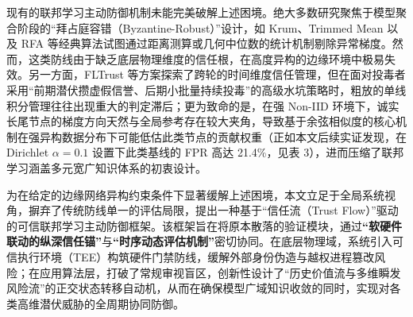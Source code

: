 \documentclass[runningheads]{llncs}
\begin{document}
现有的联邦学习主动防御机制未能完美破解上述困境。绝大多数研究聚焦于模型聚合阶段的“拜占庭容错（Byzantine-Robust）”设计，如 Krum、Trimmed Mean 以及 RFA 等经典算法试图通过距离测算或几何中位数的统计机制剔除异常梯度\cite{blanchard2017krum,yin2018byzantine,pillutla2022robust}。然而，这类防线由于缺乏底层物理维度的信任根，在高度异构的边缘环境中极易失效。另一方面，FLTrust 等方案探索了跨轮的时间维度信任管理\cite{cao2021fltrust,fung2020foolsgold}，但在面对投毒者采用“前期潜伏攒虚假信誉、后期小批量持续投毒”的高级水坑策略时，粗放的单线积分管理往往出现重大的判定滞后；更为致命的是，在强 Non-IID 环境下，诚实长尾节点的梯度方向天然与全局参考存在较大夹角，导致基于余弦相似度的核心机制在强异构数据分布下可能低估此类节点的贡献权重（正如本文后续实证发现，在 Dirichlet $\alpha=0.1$ 设置下此类基线的 FPR 高达 21.4\%，见表 3），进而压缩了联邦学习涵盖多元宽广知识体系的初衷设计。

为在给定的边缘网络异构约束条件下显著缓解上述困境，本文立足于全局系统视角，摒弃了传统防线单一的评估局限，提出一种基于“信任流（Trust Flow）”驱动的可信联邦学习主动防御框架。该框架旨在将原本散落的验证模块，通过\textbf{“软硬件联动的纵深信任锚”}与\textbf{“时序动态评估机制”}密切协同。在底层物理域，系统引入可信执行环境（TEE）构筑硬件门禁防线，缓解外部身份伪造与越权进程篡改风险；在应用算法层，打破了常规审视盲区，创新性设计了“历史价值流与多维瞬发风险流”的正交状态转移自动机，从而在确保模型广域知识收敛的同时，实现对各类高维潜伏威胁的全周期协同防御。
\end{document}
